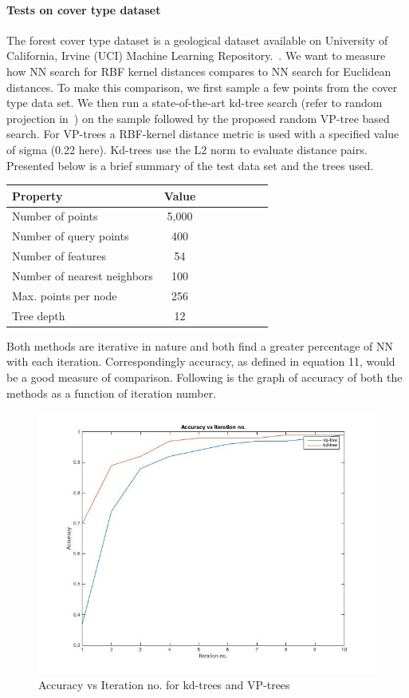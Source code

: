\documentclass[11pt]{article}
\begin{document}
\paragraph{Tests on cover type dataset} The forest cover type dataset is a geological dataset available on University of California, Irvine (UCI) Machine Learning Repository.~\cite{Blackard98}. We want to measure how NN search for RBF kernel distances compares to NN search for Euclidean distances. To make this comparison, we first sample a few points from the cover type data set. We then run a state-of-the-art kd-tree search (refer to random projection in~\cite{Moon11}) on the sample followed by the proposed random VP-tree based search. For VP-trees a RBF-kernel distance metric is used with a specified value of sigma (0.22 here). Kd-trees use the L2 norm to evaluate distance pairs. Presented below is a brief summary of the test data set and the trees used.  
\begin{center}
\begin{tabular}{l*{6}{c}r} Property & Value \\ 
\hline 
Number of points & 5,000 \\ 
Number of query points & 400 \\ 
Number of features & 54 \\ 
Number of nearest neighbors & 100 \\ 
Max. points per node & 256 \\
Tree depth & 12 \\
\end{tabular}
 \label{tab:results_covtupe}
\end{center}
Both methods are iterative in nature and both find a greater percentage of NN with each iteration. Correspondingly accuracy, as defined in equation 11, would be a good measure of comparison. Following is the graph of accuracy of both the methods as a function of iteration number. 
\begin{figure}[ht]
\centering
\includegraphics[scale=0.5]{./images/kdvsvp.jpg}
\caption{Accuracy vs Iteration no. for kd-trees and VP-trees}
\label{fig:vpvskd}
\end{figure}
\end{document}
